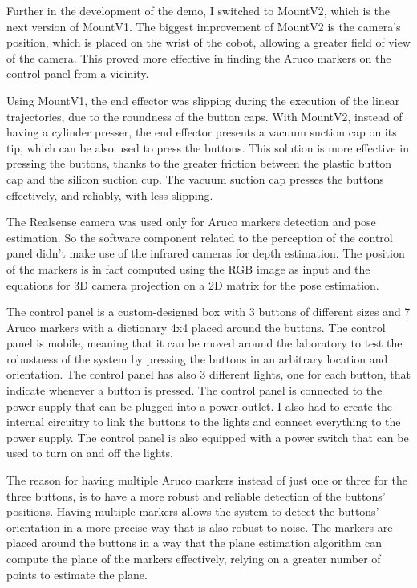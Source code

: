 Further in the development of the demo, I switched to MountV2, which is the next version of MountV1.
The biggest improvement of MountV2 is the camera's position, which is placed on the wrist of the cobot,
allowing a greater field of view of the camera. This proved more effective in finding the Aruco markers
on the control panel from a vicinity. 

Using MountV1, the end effector was slipping during the execution of the linear trajectories, due to the
roundness of the button caps. With MountV2, instead of having a cylinder presser, 
the end effector presents a vacuum suction cap on its tip, which can be also used to press the buttons. 
This solution is more effective in pressing the buttons, thanks to the greater friction between the plastic
button cap and the silicon suction cup. The vacuum suction cap presses the buttons effectively,
and reliably, with less slipping.

The Realsense camera was used only for Aruco markers detection and pose estimation. So the software
component related to the perception of the control panel didn't make use of the infrared cameras for 
depth estimation. The position of the markers is in fact computed using the RGB image as input and
the equations for 3D camera projection on a 2D matrix for the pose estimation.

The control panel is a custom-designed box with 3 buttons of different sizes and 7 Aruco markers
with a dictionary 4x4 placed around the buttons. The control panel is mobile, meaning that it can be moved
around the laboratory to test the robustness of the system by pressing the buttons in an 
arbitrary location and orientation. The control panel has also 3 different lights, one for each button,
that indicate whenever a button is pressed. The control panel is connected to the power supply that 
can be plugged into a power outlet. I also had to create the internal circuitry to link the buttons
to the lights and connect everything to the power supply. The control panel is also equipped with
a power switch that can be used to turn on and off the lights.

The reason for having multiple Aruco markers instead of just one or three for the three buttons,
is to have a more robust and reliable detection of the buttons' positions. Having multiple markers
allows the system to detect the buttons' orientation in a more precise way that is also robust to noise.
The markers are placed around the buttons in a way that the plane estimation algorithm can compute
the plane of the markers effectively, relying on a greater number of points to estimate the plane.

